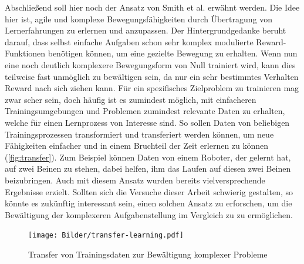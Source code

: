 Abschließend soll hier noch der Ansatz von Smith et al. \cite{smith2023learning} erwähnt werden.
Die Idee hier ist, agile und komplexe Bewegungsfähigkeiten durch Übertragung von Lernerfahrungen zu erlernen und anzupassen.
Der Hintergrundgedanke beruht darauf, dass selbst einfache Aufgaben schon sehr komplex modulierte Reward-Funktionen benötigen können, um eine gezielte Bewegung zu erhalten.
Wenn nun eine noch deutlich komplexere Bewegungsform von Null trainiert wird, kann dies teilweise fast unmöglich zu bewältigen sein, da nur ein sehr bestimmtes Verhalten Reward nach sich ziehen kann.
Für ein spezifisches Zielproblem zu trainieren mag zwar scher sein, doch häufig ist es zumindest möglich, mit einfacheren Trainingsumgebungen und Problemen zumindest relevante Daten zu erhalten, welche für einen Lernprozess von Interesse sind.
So sollen Daten von beliebigen Trainingsprozessen transformiert und transferiert werden können, um neue Fähigkeiten einfacher und in einem Bruchteil der Zeit erlernen zu können (\autoref{fig:transfer}).
Zum Beispiel können Daten von einem Roboter, der gelernt hat, auf zwei Beinen zu stehen, dabei helfen, ihm das Laufen auf diesen zwei Beinen beizubringen.
Auch mit diesem Ansatz wurden bereits vielversprechende Ergebnisse erzielt.
Sollten sich die Versuche dieser Arbeit schwierig gestalten, so könnte es zukünftig interessant sein, einen solchen Ansatz zu erforschen, um die Bewältigung der komplexeren Aufgabenstellung im Vergleich zu \cite{waidner.2020} zu ermöglichen.


\begin{figure}
    \centering
    \texttt{[image: Bilder/transfer-learning.pdf]}
    \caption{Transfer von Trainingsdaten zur Bewältigung komplexer Probleme \cite{smith2023learning}}
    \label{fig:transfer}
\end{figure}